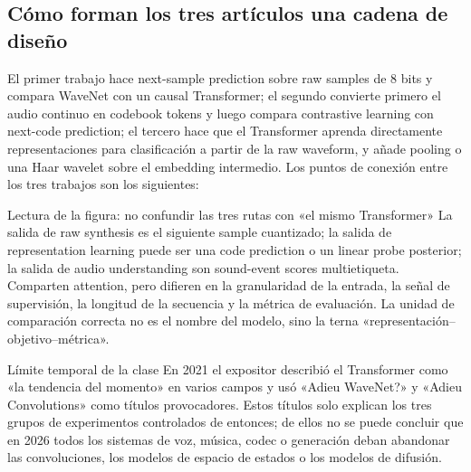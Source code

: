
\subsection{Cómo forman los tres artículos una cadena de diseño}

El primer trabajo hace next-sample prediction sobre raw samples de 8 bits y compara WaveNet con un causal Transformer; el segundo convierte primero el audio continuo en codebook tokens y luego compara contrastive learning con next-code prediction; el tercero hace que el Transformer aprenda directamente representaciones para clasificación a partir de la raw waveform, y añade pooling o una Haar wavelet sobre el embedding intermedio. Los puntos de conexión entre los tres trabajos son los siguientes:


\begin{knowledgebox}{Lectura de la figura: no confundir las tres rutas con «el mismo Transformer»}
La salida de raw synthesis es el siguiente sample cuantizado; la salida de representation learning puede ser una code prediction o un linear probe posterior; la salida de audio understanding son sound-event scores multietiqueta. Comparten attention, pero difieren en la granularidad de la entrada, la señal de supervisión, la longitud de la secuencia y la métrica de evaluación. La unidad de comparación correcta no es el nombre del modelo, sino la terna «representación--objetivo--métrica».
\end{knowledgebox}

\begin{warningbox}{Límite temporal de la clase}
En 2021 el expositor describió el Transformer como «la tendencia del momento» en varios campos y usó «Adieu WaveNet?» y «Adieu Convolutions» como títulos provocadores. Estos títulos solo explican los tres grupos de experimentos controlados de entonces; de ellos no se puede concluir que en 2026 todos los sistemas de voz, música, codec o generación deban abandonar las convoluciones, los modelos de espacio de estados o los modelos de difusión.
\end{warningbox}

